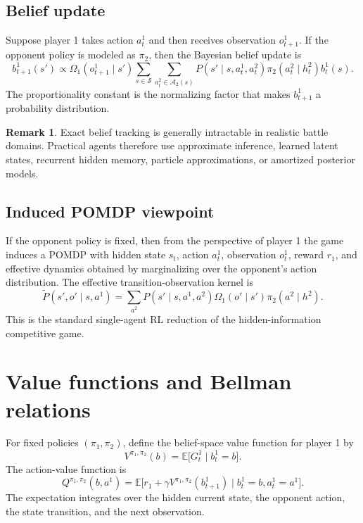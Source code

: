 \documentclass[aps,pre,twocolumn,superscriptaddress,nofootinbib]{revtex4-2}
\newcommand{\cS}{\mathcal{S}}
\newcommand{\cA}{\mathcal{A}}
\newcommand{\EE}{\mathbb{E}}
\theoremstyle{definition}
\newtheorem{rmk}{Remark}
\theoremstyle{plain}
\begin{document}
\subsection{Belief update}

Suppose player 1 takes action $a_t^1$ and then receives observation $o_{t+1}^1$. If the opponent policy is modeled as $\pi_2$, then the Bayesian belief update is
\begin{equation}
    b_{t+1}^1(s')
    \propto
    \Omega_1(o_{t+1}^1\mid s')
    \sum_{s\in\cS}
    \sum_{a_t^2\in \cA_2(s)}
    P(s'\mid s,a_t^1,a_t^2)
    \pi_2(a_t^2\mid h_t^2)
    b_t^1(s).
    \label{eq:belief_update}
\end{equation}
The proportionality constant is the normalizing factor that makes $b_{t+1}^1$ a probability distribution.

\begin{rmk}
    Exact belief tracking is generally intractable in realistic battle domains. Practical agents therefore use approximate inference, learned latent states, recurrent hidden memory, particle approximations, or amortized posterior models.
\end{rmk}

\subsection{Induced POMDP viewpoint}

If the opponent policy is fixed, then from the perspective of player 1 the game induces a POMDP with hidden state $s_t$, action $a_t^1$, observation $o_t^1$, reward $r_1$, and effective dynamics obtained by marginalizing over the opponent's action distribution. The effective transition-observation kernel is
\begin{equation}
    \widetilde{P}(s',o'\mid s,a^1)
    =
    \sum_{a^2}
    P(s'\mid s,a^1,a^2)
    \Omega_1(o'\mid s')
    \pi_2(a^2\mid h^2).
\end{equation}
This is the standard single-agent RL reduction of the hidden-information competitive game.

\section{Value functions and Bellman relations}
\label{sec:values}

For fixed policies $(\pi_1,\pi_2)$, define the belief-space value function for player 1 by
\begin{equation}
    V^{\pi_1,\pi_2}(b)
    =
    \EE\big[G_t^1\mid b_t^1=b\big].
\end{equation}
The action-value function is
\begin{equation}
    Q^{\pi_1,\pi_2}(b,a^1)
    =
    \EE\big[r_1 + \gamma V^{\pi_1,\pi_2}(b_{t+1}^1)
        \mid b_t^1=b, a_t^1=a^1\big].
\end{equation}
The expectation integrates over the hidden current state, the opponent action, the state transition, and the next observation.
\end{document}
